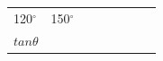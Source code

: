 \begin{center}
\begin{xtabular*}{\mytablewidth}[t]{|p{10\mystarwidth}|p{10\mystarwidth}|p{10\mystarwidth}|p{10\mystarwidth}|p{10\mystarwidth}|p{10\mystarwidth}|p{10\mystarwidth}|p{10\mystarwidth}|}
    
        120\begin{math}{}^{\circ }\end{math} &
    
    
        150\begin{math}{}^{\circ }\end{math} &
    
    
     \tabularnewline{}
    
    
        
                  \begin{math}tan\theta \end{math}
                 &
    
    
         &
    
    
         &
    
    
         &
    

\end{xtabular*}
\end{center}
